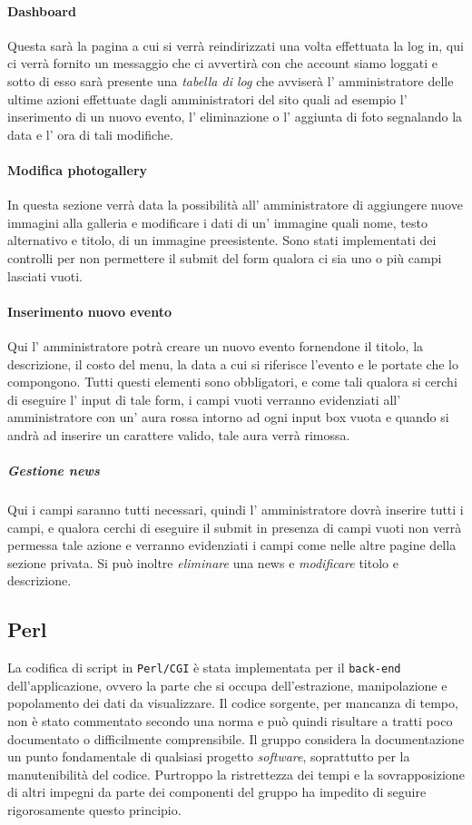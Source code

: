 \paragraph{Dashboard}
Questa sarà la pagina a cui si verrà reindirizzati una volta effettuata la log in, qui ci verrà fornito un messaggio che ci avvertirà con che account siamo loggati e sotto di esso sarà presente una \emph{tabella di log} che avviserà l' amministratore delle ultime azioni effettuate dagli amministratori del sito quali ad esempio l' inserimento di un nuovo evento, l' eliminazione o l' aggiunta di foto segnalando la data e l' ora di tali modifiche.
\paragraph{Modifica photogallery}
In questa sezione verrà data la possibilità all' amministratore di aggiungere nuove immagini alla galleria e modificare i dati di un' immagine quali nome, testo alternativo e titolo, di un immagine preesistente. Sono stati implementati dei controlli per non permettere il submit del form qualora ci sia uno o più campi lasciati vuoti.
\paragraph{Inserimento nuovo evento}
Qui l' amministratore potrà creare un nuovo evento fornendone il titolo, la descrizione, il costo del menu, la data a cui si riferisce l'evento e le portate che lo compongono. Tutti questi elementi sono obbligatori, e come tali qualora si cerchi di eseguire l' input di tale form, i campi vuoti verranno evidenziati all' amministratore con un' aura rossa intorno ad ogni input box vuota e quando si andrà ad inserire un carattere valido, tale aura verrà rimossa.
\subparagraph{Gestione news}
Qui i campi saranno tutti necessari, quindi l' amministratore dovrà inserire tutti i campi, e qualora cerchi di eseguire il submit in presenza di campi vuoti non verrà permessa tale azione e verranno evidenziati i campi come nelle altre pagine della sezione privata.
Si può inoltre \emph{eliminare} una news e \emph{modificare} titolo e descrizione. 

\subsection{Perl}

La codifica di script in \texttt{Perl/CGI} è stata implementata per il \texttt{back-end} dell'applicazione, ovvero la parte che si occupa dell'estrazione, manipolazione e popolamento dei dati da visualizzare. Il codice sorgente, per mancanza di tempo, non è stato commentato secondo una norma e può quindi risultare a tratti poco documentato o difficilmente comprensibile. Il gruppo considera la documentazione un punto fondamentale di qualsiasi progetto \textit{software}, soprattutto per la manutenibilità del codice. Purtroppo la ristrettezza dei tempi e la sovrapposizione di altri impegni da parte dei componenti del gruppo ha impedito di seguire rigorosamente questo principio.

